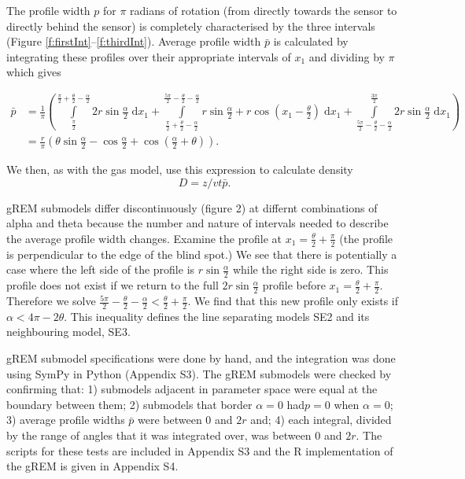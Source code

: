 \documentclass[a4paper,10pt,reqno,oneside]{amsart}
\begin{document}
The profile width $p$ for $\pi$ radians of rotation (from directly towards the sensor to directly behind the sensor) is completely characterised by the three intervals (Figure \ref{f:firstInt}--\ref{f:thirdInt}). Average profile width $\bar{p}$ is calculated by integrating these profiles over their appropriate intervals of $x_1$ and dividing by $\pi$ which gives

\begin{align}
    \bar{p} &=\frac{1}{\pi} \left(\int\limits_{\frac{\pi}{2}}^{\frac{\pi}{2} + \frac{\theta}{2} - \frac{\alpha}{2}}2 r \sin{\frac{\alpha}{2} }\;\mathrm{d}x_1+\int\limits_{\frac{\pi}{2} + \frac{\theta}{2} - \frac{\alpha}{2}}^{\frac{5 \pi}{2} - \frac{\theta}{2} - \frac{\alpha}{2}}r \sin{\frac{\alpha}{2} } + r \cos{\left (x_1 - \frac{\theta}{2} \right )}\;\mathrm{d}x_1+\int\limits_{\frac{5 \pi}{2} - \frac{\theta}{2} - \frac{\alpha}{2}}^{\frac{3 \pi}{2}}2 r \sin{\frac{\alpha}{2} }\;\mathrm{d}x_1\right) \nonumber  \\
     &= \frac{r}{\pi} \left(\theta \sin{\frac{\alpha}{2} } - \cos{\frac{\alpha}{2} } + \cos{\left (\frac{\alpha}{2} + \theta \right )}\right). \label{e:p321}
\end{align}

We then, as with the gas model, use this expression to calculate density
\begin{equation}
\label{e:gas}
D = z/vt\bar{p}.
\end{equation}




gREM submodels differ discontinuously (figure 2) at differnt combinations of alpha and theta because the number and nature of intervals needed to describe the average profile width changes.  
Examine the profile at $x_1 = 	\frac{\theta}{2} + \frac{\pi}{2}$ (the profile is perpendicular to the edge of the blind spot.) We see that there is potentially a case where the left side of the profile is $r\sin \frac{\alpha}{2}$ while the right side is zero. This profile does not exist if we return to the full $2r\sin \frac{\alpha}{2}$ profile before $x_1  = \frac{\theta}{2} + \frac{\pi}{2}$. Therefore we solve $\frac{5\pi}{2} - \frac{\theta}{2} - \frac{\alpha}{2} <  \frac{\theta}{2} + \frac{\pi}{2}$. We find that this new profile only exists if $ \alpha < 4\pi - 2 \theta$. This inequality defines the line separating models SE2 and its neighbouring model, SE3.

gREM submodel specifications were done by hand, and the integration was done using SymPy \citep{sympy} in Python (Appendix S3). The gREM submodels were checked by confirming that: 1) submodels adjacent in parameter space were equal at the boundary between them; 2) submodels that border $ \alpha = 0$ had$p = 0$ when $ \alpha = 0$; 3) average profile widths $\bar{p}$ were between 0 and $2r$ and; 4) each integral, divided by the range of angles that it was integrated over, was between 0 and $2r$. The scripts for these tests are included in Appendix S3 and the R \citep{R} implementation of the gREM is given in Appendix S4.  
\end{document}
